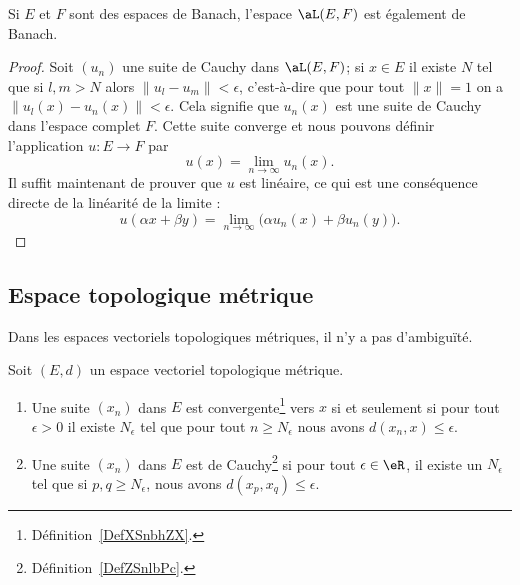 \begin{lemma}       \label{LemCAIPooPMNbXg}
	Si \( E\) et \( F\) sont des espaces de Banach, l'espace \( \aL(E,F)\) est également de Banach.
\end{lemma}

\begin{proof}
	Soit \( (u_n)\) une suite de Cauchy dans \( \aL(E,F)\); si \( x\in E\) il existe \( N\) tel que si \( l,m>N\) alors \( \| u_l-u_m \|<\epsilon\), c'est-à-dire que pour tout \( \| x \|=1\) on a \( \| u_l(x)-u_n(x) \|<\epsilon\). Cela signifie que \( u_n(x)\) est une suite de Cauchy dans l'espace complet \( F\). Cette suite converge et nous pouvons définir l'application \( u\colon E\to F\) par
	\begin{equation}
		u(x)=\lim_{n\to \infty} u_n(x).
	\end{equation}
	Il suffit maintenant de prouver que \( u\) est linéaire, ce qui est une conséquence directe de la linéarité de la limite :
	\begin{equation}
		u(\alpha x+\beta y)=\lim_{n\to \infty} \big( \alpha u_n(x)+\beta u_n(y) \big).
	\end{equation}
\end{proof}








\subsection{Espace topologique métrique}

Dans les espaces vectoriels topologiques métriques, il n'y a pas d'ambiguïté.
\begin{proposition}     \label{PropooUEEOooLeIImr}
	Soit \( (E,d)\) un espace vectoriel topologique métrique.
	\begin{enumerate}
		\item   \label{ItemooROYMooAQCXnj}
		      Une suite \( (x_n)\) dans \( E\) est convergente\footnote{Définition~\ref{DefXSnbhZX}.} vers \( x\) si et seulement si pour tout \( \epsilon>0\) il existe \( N_{\epsilon}\) tel que pour tout \( n\geq N_{\epsilon}\) nous avons \( d(x_n,x)\leq \epsilon\).
		\item
		      Une suite \( (x_n)\) dans \( E\) est de Cauchy\footnote{Définition~\ref{DefZSnlbPc}.} si pour tout \( \epsilon\in \eR\), il existe un \( N_{\epsilon}\) tel que si \( p,q\geq N_{\epsilon}\), nous avons \( d(x_p,x_q)\leq \epsilon\).
	\end{enumerate}
\end{proposition}

